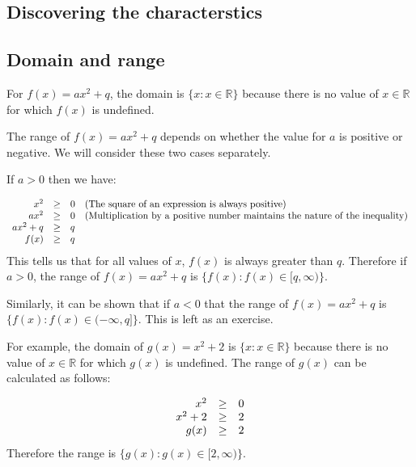 \subsection*{Discovering the characterstics}

\subsection*{Domain and range}
\nopagebreak
For $f(x)=a{x}^{2}+q$, the domain is $\{x:x\in \mathbb{R}\}$ because there is no value of $x\in \mathbb{R}$ for which $f(x)$ is undefined.\par 
The range of $f(x)=a{x}^{2}+q$ depends on whether the value for $a$ is positive or negative. We will consider these two cases separately.\par 
If $a>0$ then we have:\par 
\nopagebreak\noindent{}
\begin{equation*}
\begin{array}{cccc}\hfill {x}^{2}& \ge & 0\hfill & (\mbox{The square of an expression is always positive})\hfill \\ \hfill a{x}^{2}& \ge & 0\hfill & (\mbox{Multiplication by a positive number maintains the nature of the inequality})\hfill \\ \hfill a{x}^{2}+q& \ge & q\hfill & \\ \hfill f(x)& \ge & q\hfill & \end{array}
\end{equation*}
This tells us that for all values of $x$, $f(x)$ is always greater than $q$. Therefore if $a>0$, the range of $f(x)=a{x}^{2}+q$ is $\{f(x):f(x)\in [q,\infty )\}$.\par 
Similarly, it can be shown that if $a<0$ that the range of $f(x)=a{x}^{2}+q$ is $\{f(x):f(x)\in (-\infty ,q]\}$. This is left as an exercise.\par 
For example, the domain of $g(x)={x}^{2}+2$ is $\{x:x\in \mathbb{R}\}$ because there is no value of $x\in \mathbb{R}$ for which $g(x)$ is undefined. The range of $g(x)$ can be calculated as follows:\par 
\nopagebreak\noindent{}
\begin{equation*}
\begin{array}{ccc}\hfill {x}^{2}& \ge & 0\hfill \\ \hfill {x}^{2}+2& \ge & 2\hfill \\ \hfill g(x)& \ge & 2\hfill \end{array}
\end{equation*}
Therefore the range is $\{g(x):g(x)\in [2,\infty )\}$.\par 

